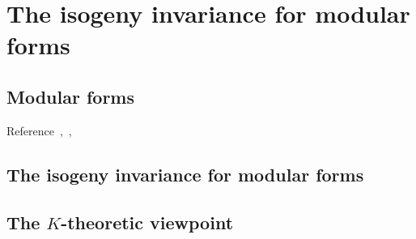 
\chapter{The isogeny invariance for modular forms}
\label{chap1}

\tab
\section{Modular forms}
Reference~\cite{Mi1989},~\cite{DS2005},~\cite{AF1995}


\newpage
\section{The isogeny invariance for modular forms}

\newpage
\section{The $K$-theoretic viewpoint}


\endinput

Any text after an \endinput is ignored.
You could put scraps here or things in progress.
